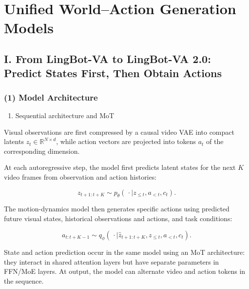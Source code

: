 \setcounter{section}{1}

\hypertarget{unified-worldaction-generation-models}{%
\section{Unified World--Action Generation Models}\label{unified-worldaction-generation-models}}

\hypertarget{i.-from-lingbot-va-to-lingbot-va-2.0-predict-states-first-then-obtain-actions}{%
\subsection{I. From LingBot-VA to LingBot-VA 2.0: Predict States First, Then Obtain Actions}\label{i.-from-lingbot-va-to-lingbot-va-2.0-predict-states-first-then-obtain-actions}}

\hypertarget{model-architecture-2}{%
\subsubsection{(1) Model Architecture}\label{model-architecture-2}}

\begin{enumerate}
\def\labelenumi{\arabic{enumi}.}
\tightlist
\item
  Sequential architecture and MoT
\end{enumerate}

Visual observations are first compressed by a causal video VAE into compact latents \(z_t\in\mathbb{R}^{N\times d}\), while action vectors are projected into tokens \(a_t\) of the corresponding dimension.

At each autoregressive step, the model first predicts latent states for the next \(K\) video frames from observation and action histories:

\[
z_{t+1:t+K}\sim p_\theta\!\left(\,\cdot\mid z_{\leq t},a_{\lt t},c_t\right).
\]

The motion-dynamics model then generates specific actions using predicted future visual states, historical observations and actions, and task conditions:

\[
a_{t:t+K-1}\sim q_\phi\!\left(\,\cdot\mid\hat{z}_{t+1:t+K},z_{\leq t},a_{\lt t},c_t\right).
\]

State and action prediction occur in the same model using an MoT architecture: they interact in shared attention layers but have separate parameters in FFN/MoE layers. At output, the model can alternate video and action tokens in the sequence.

